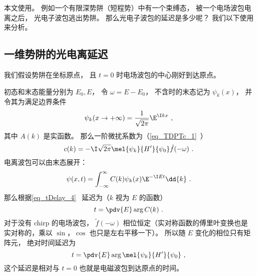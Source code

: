 
\begin{issues}
\issueDraft
\end{issues}


本文使用。 例如一个有限深势阱（短程势）中有一个束缚态， 被一个电场波包电离之后， 光电子波包逃出势阱。 那么光电子波包的延迟是多少呢？ 我们以下使用来分析。

\subsection{一维势阱的光电离延迟}
我们假设势阱在坐标原点， 且 $t = 0$ 时电场波包的中心刚好到达原点。

初态和末态能量分别为 $E_0, E$， 令 $\omega = E - E_0$， 不含时的末态记为 $\psi_k(x)$， 并令其为满足边界条件
\begin{equation}\label{eq_HeAna2_2}
\psi_k(x \to +\infty) = \frac{1}{\sqrt{2\pi}}\E^{\I kx}~,
\end{equation}
其中 $A(k)$ 是实函数。 那么一阶微扰系数为（\autoref{eq_TDPTc_1}~）
\begin{equation}
c(k) = -\I \sqrt{2\pi} \mel{\psi_k}{H'}{\psi_0} \tilde f(-\omega)~.
\end{equation}
电离波包可以由末态展开：
\begin{equation}
\psi(x, t) = \int_{-\infty}^{\infty} C(k) \psi_k(x)\E^{-\I E t} \dd{k}~.
\end{equation}
那么根据\autoref{eq_tDelay_4}~ 延迟为（$k$ 视为 $E$ 的函数）
\begin{equation}\label{eq_HeAna2_3}
t = \pdv{E} \arg C(k)~.
\end{equation}
对于没有 chirp 的电场波包， $\tilde f(-\omega)$ 相位恒定（实对称函数的傅里叶变换也是实对称的，乘以 $\sin$，$\cos$ 也只是左右平移一下）。 所以随 $E$ 变化的相位只有矩阵元， 绝对时间延迟为
\begin{equation}\label{eq_HeAna2_1}
t = \pdv{E} \arg \mel{\psi_k}{H'}{\psi_0}~,
\end{equation}
这个延迟是相对与 $t = 0$ 也就是电磁波包到达原点的时间。

